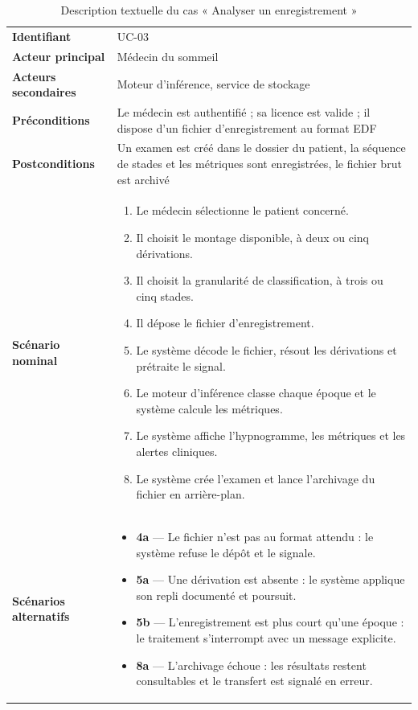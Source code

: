 \begin{table}[H]
\centering

\small
\begin{tabular}{@{}L{3.0cm}L{11.4cm}@{}}
\toprule
\textbf{Identifiant} & UC-03 \\
\textbf{Acteur principal} & Médecin du sommeil \\
\textbf{Acteurs secondaires} & Moteur d'inférence, service de stockage \\
\textbf{Préconditions} & Le médecin est authentifié ; sa licence est valide ; il
dispose d'un fichier d'enregistrement au format EDF \\
\textbf{Postconditions} & Un examen est créé dans le dossier du patient, la séquence
de stades et les métriques sont enregistrées, le fichier brut est archivé \\
\midrule
\textbf{Scénario nominal} &
\begin{minipage}[t]{11.2cm}
\begin{enumerate}[leftmargin=1.1em,itemsep=1pt,topsep=2pt]
  \item Le médecin sélectionne le patient concerné.
  \item Il choisit le montage disponible, à deux ou cinq dérivations.
  \item Il choisit la granularité de classification, à trois ou cinq stades.
  \item Il dépose le fichier d'enregistrement.
  \item Le système décode le fichier, résout les dérivations et prétraite le signal.
  \item Le moteur d'inférence classe chaque époque et le système calcule les métriques.
  \item Le système affiche l'hypnogramme, les métriques et les alertes cliniques.
  \item Le système crée l'examen et lance l'archivage du fichier en arrière-plan.
\end{enumerate}
\end{minipage} \\
\midrule
\textbf{Scénarios alternatifs} &
\begin{minipage}[t]{11.2cm}
\begin{itemize}[leftmargin=1.1em,itemsep=1pt,topsep=2pt]
  \item \textbf{4a} --- Le fichier n'est pas au format attendu : le système refuse le
        dépôt et le signale.
  \item \textbf{5a} --- Une dérivation est absente : le système applique son repli
        documenté et poursuit.
  \item \textbf{5b} --- L'enregistrement est plus court qu'une époque : le traitement
        s'interrompt avec un message explicite.
  \item \textbf{8a} --- L'archivage échoue : les résultats restent consultables et le
        transfert est signalé en erreur.
\end{itemize}
\end{minipage} \\
\bottomrule
\end{tabular}
\caption{Description textuelle du cas « Analyser un enregistrement »}
\label{tab:desc-analyse}
\end{table}

